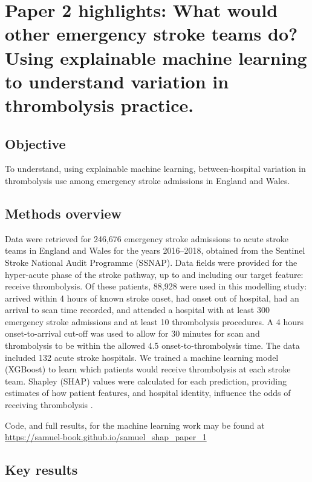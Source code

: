 \section{Paper 2 highlights: What would other emergency stroke teams do? Using explainable machine learning to understand variation in thrombolysis practice.\cite{pearn_what_2023}}\label{sec:paper_2}

\subsection{Objective}

To understand, using explainable machine learning, between-hospital variation in thrombolysis use among emergency stroke admissions in England and Wales.

\subsection{Methods overview}


Data were retrieved for 246,676 emergency stroke admissions to acute stroke teams in England and Wales for the years 2016–2018, obtained from the Sentinel Stroke National Audit Programme (SSNAP). Data fields were provided for the hyper-acute phase of the stroke pathway, up to and including our target feature: receive thrombolysis. Of these patients, 88,928 were used in this modelling study: arrived within 4 hours of known stroke onset, had onset out of hospital, had an arrival to scan time recorded, and attended a hospital with at least 300 emergency stroke admissions and at least 10 thrombolysis procedures. A 4 hours onset-to-arrival cut-off was used to allow for 30 minutes for scan and thrombolysis to be within the allowed 4.5 onset-to-thrombolysis time. The data included 132 acute stroke hospitals. We trained a machine learning model (XGBoost\cite{chen_xgboost_2016}) to learn which patients would receive thrombolysis at each stroke team. Shapley (SHAP) values were calculated for each prediction, providing estimates of how patient features, and hospital identity, influence the odds of receiving thrombolysis \cite{lundberg_unified_2017}.

Code, and full results, for the machine learning work may be found at 
 \url{https://samuel-book.github.io/samuel_shap_paper_1}

\subsection{Key results}

